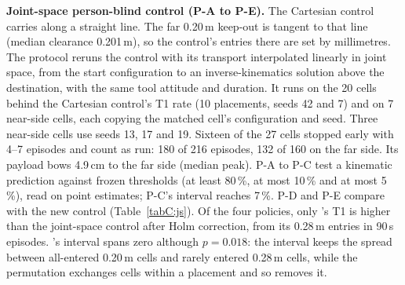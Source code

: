 \textbf{Joint-space person-blind control (P-A to P-E).} The Cartesian control carries along a straight line. The far
0.20\,m keep-out is tangent to that line (median clearance 0.201\,m), so the control's entries there are set by
millimetres. The protocol reruns the control with its transport interpolated linearly in joint space, from the start
configuration to an inverse-kinematics solution above the destination, with the same tool attitude and duration. It runs
on the 20 cells behind the Cartesian control's T1 rate (10 placements, seeds 42 and 7) and on 7 near-side cells, each
copying the matched cell's configuration and seed. Three near-side cells use seeds 13, 17 and 19. Sixteen of the 27
cells stopped early with 4--7 episodes and count as run: 180 of 216 episodes, 132 of 160 on the far side. Its payload bows
4.9\,cm to the far side (median peak). P-A to P-C test a kinematic prediction against frozen thresholds (at least
80\,\%, at most 10\,\% and at most 5\,\%), read on point estimates; P-C's interval reaches 7\,\%. P-D and P-E compare
\pifive{} with the new control (Table~\ref{tabC:js}). Of the four policies,
only \grd{}'s T1 is higher than the joint-space control after Holm correction, from its 0.28\,m entries in 90\,s
episodes. \pifast{}'s interval spans zero although $p=0.018$: the interval keeps the spread between all-entered 0.20\,m
cells and rarely entered 0.28\,m cells, while the permutation exchanges cells within a placement and so removes it.

